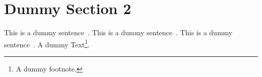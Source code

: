 \section{Dummy Section 2}
\label{sec:dummy2}

This is a dummy sentence~\cite{Alpher02}. This is a dummy sentence~\cite{Alpher03}. This is a dummy sentence~\cite{Alpher04}. A dummy Text\footnote{A dummy footnote.}.
